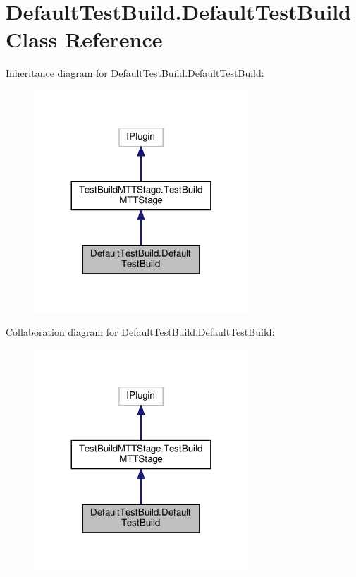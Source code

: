 \hypertarget{class_default_test_build_1_1_default_test_build}{\section{Default\-Test\-Build.\-Default\-Test\-Build Class Reference}
\label{class_default_test_build_1_1_default_test_build}
}


Inheritance diagram for Default\-Test\-Build.\-Default\-Test\-Build\-:
\nopagebreak
\begin{figure}[H]
\begin{center}
\leavevmode
\includegraphics[width=228pt]{class_default_test_build_1_1_default_test_build__inherit__graph}
\end{center}
\end{figure}


Collaboration diagram for Default\-Test\-Build.\-Default\-Test\-Build\-:
\nopagebreak
\begin{figure}[H]
\begin{center}
\leavevmode
\includegraphics[width=228pt]{class_default_test_build_1_1_default_test_build__coll__graph}
\end{center}
\end{figure}
